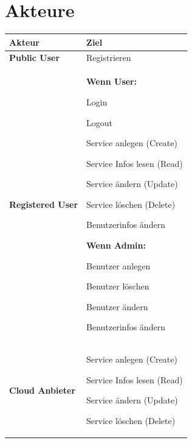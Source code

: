 \documentclass[11pt]{scrartcl}
\begin{document}
\section{Akteure}
\begin{tabularx}{\linewidth}{X X}
\textbf{Akteur} & \textbf{Ziel}\\
\hline
\textbf{Public User} &
Registrieren
\\
\hline
\textbf{Registered User} & 
\textbf{Wenn User:}

Login

Logout

Service anlegen (Create)

Service Infos lesen (Read)

Service ändern (Update)

Service löschen (Delete)

Benutzerinfos ändern

\textbf{Wenn Admin:}

Benutzer anlegen

Benutzer löschen

Benutzer ändern

Benutzerinfos ändern

\\
\hline
\textbf{Cloud Anbieter} &
Service anlegen (Create)

Service Infos lesen (Read)

Service ändern (Update)

Service löschen (Delete)
\\

\end{tabularx}
\end{document}
